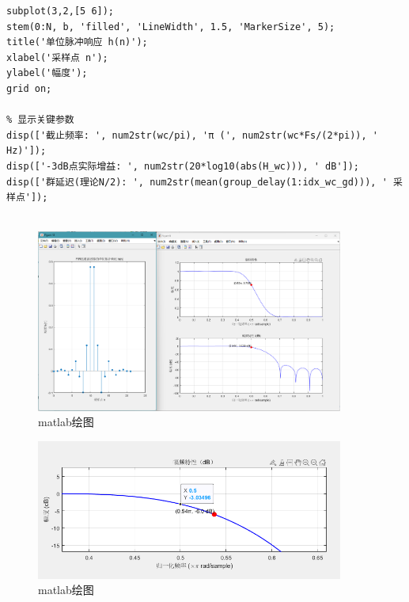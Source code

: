 \documentclass[12pt,hyperref,a4paper,UTF8]{ctexart}
\begin{document}
\begin{lstlisting}[style=matlab, caption={实验一MATLAB实现代码}]
% 5. 单位脉冲响应
subplot(3,2,[5 6]);
stem(0:N, b, 'filled', 'LineWidth', 1.5, 'MarkerSize', 5);
title('单位脉冲响应 h(n)');
xlabel('采样点 n');
ylabel('幅度');
grid on;

% 显示关键参数
disp(['截止频率: ', num2str(wc/pi), 'π (', num2str(wc*Fs/(2*pi)), ' Hz)']);
disp(['-3dB点实际增益: ', num2str(20*log10(abs(H_wc))), ' dB']);
disp(['群延迟(理论N/2): ', num2str(mean(group_delay(1:idx_wc_gd))), ' 采样点']);


\end{lstlisting}



\begin{figure}[H] %
        \centering
        \includegraphics[width=0.9\textwidth]{figures/304.png} %
        \caption{matlab绘图} %
        \label{fig:example} %
\end{figure}

\begin{figure}[H] %
        \centering
        \includegraphics[width=0.9\textwidth]{figures/305.png} %
        \caption{matlab绘图} %
        \label{fig:example} %
\end{figure}
\end{document}
